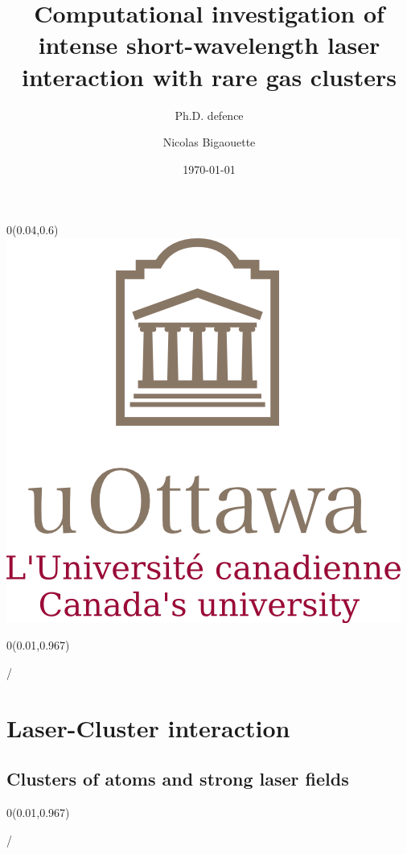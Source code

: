 \documentclass{beamer}
\title{Computational investigation of intense short-wavelength laser interaction with rare gas clusters}
\subtitle{Ph.D. defence}
\author{Nicolas Bigaouette}
\date[December 2013]{\today}
\institute{Computational Nanophotonics Group
\newline
Physics Department -- University of Ottawa}
\makeatletter
\newcommand{\framenumber}{
\begin{textblock}{0}(0.01,0.967)
\begin{scriptsize}
{\color{gray}\insertframenumber/\inserttotalframenumber}
\end{scriptsize}
\end{textblock}
}
\makeatother
\begin{document}
\begin{frame}{}
\titlepage
\begin{textblock}{0}(0.04,0.6)
\includegraphics[width=0.22\paperwidth]{figures/UofO}
\end{textblock}
\end{frame}

\setcounter{framenumber}{0}

\begin{frame}\framenumber
\tableofcontents
\end{frame}


\section{Laser-Cluster interaction}

\subsection{Clusters of atoms and strong laser fields}
\begin{frame}{}\framenumber
\end{frame}
\end{document}
